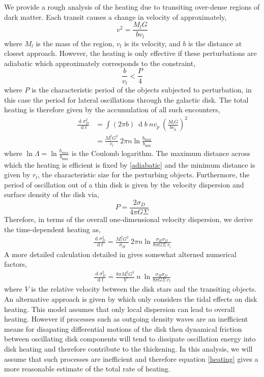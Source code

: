 \documentclass[usenatbib]{mnras}
\renewcommand{\d}[1]{\! \mathrm{d}#1 \:}
\newcommand{\deriv}[2]{\frac{\d{#1}}{\d{#2}}}
\renewcommand{\d}[1]{\ensuremath{\operatorname{d}\!{#1}}}
\begin{document}
We provide a rough analysis of the heating due to transiting over-dense regions of dark matter. Each transit causes a change in velocity of approximately,
\begin{equation}
v^2 = \frac{M_l G}{b v_l}
\end{equation}
where $M_l$ is the mass of the region, $v_l$ is its velocity, and $b$ is the distance at closest approach. However, the heating is only effective if these perturbations are adiabatic which approximately corresponds to the constraint,
\begin{equation} \label{adiabatic}
\frac{b}{v_l} < \frac{P}{4}
\end{equation}
where $P$ is the characteristic period of the objects subjected to perturbation, in this case the period for lateral oscillations through the galactic disk. The total heating is therefore given by the accumulation of all such encounters,
\begin{align}
\deriv{\sigma_D^2}{t} &= \int (2 \pi b) \: \d{b} \: n v_p \: \left( \frac{M_l G}{b v_p} \right)^2 
\\
& = \frac{M_l^2 G^2}{v_l} \: 2 \pi n \ln{\frac{b_{\text{max}}}{b_{\text{min}}}}
\end{align}
where $\ln{\Lambda} = \ln{\frac{b_{max}}{b_{\text{min}}}}$ is the Coulomb logarithm. 
The maximum distance across which the heating is efficient is fixed by \ref{adiabatic} and the minimum distance is given by $r_l$,  the characteristic size for the perturbing objects. Furthermore, the period of oscillation out of a thin disk is given by the velocity dispersion and surface density of the disk via,
\begin{equation}
P = \frac{2 \sigma_D}{4 \pi G \Sigma}
\end{equation} 
Therefore, in terms of the overall one-dimensional velocity dispersion, we derive the time-dependent heating as,
\begin{align}
\deriv{\sigma_D^2}{t}  = \frac{M_l^2 G^2}{\sigma_H} \: 2 \pi n \ln{\frac{\sigma_H \sigma_D}{8 \pi G \Sigma \: r_l}}
\end{align}
A more detailed calculation detailed in \cite{milkywayblackholes} gives somewhat alterned numerical factors,
\begin{align} \label{heating}
\deriv{\sigma_D^2}{t} =\frac{8 \pi M_l^2 G^2}{V} \: n \: \ln{\frac{\sigma_H \sigma_D}{8 \pi G \Sigma \: r_l}}
\end{align}
where $V$ is the relative velocity between the disk stars and the transiting objects. An alternative approach is given by \cite{ultralight} which only considers the tidal effects on disk heating. This model assumes that only local dispersion can lead to overall heating. However if processes such as outgoing density waves are an inefficient means for disapating differential motions of the disk then dynamical friction between oscillating disk components will tend to dissipate oscillation energy into disk heating and therefore contribute to the thickening. In this analysis, we will assume that such processes are inefficient and therefore equation \ref{heating} gives a more reasonable estimate of the total rate of heating.  
\end{document}
